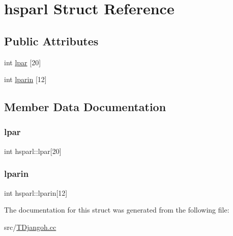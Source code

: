 \hypertarget{structhsparl}{}\section{hsparl Struct Reference}
\label{structhsparl}
\subsection*{Public Attributes}
\begin{DoxyCompactItemize}
\item 
int \hyperlink{structhsparl_a250d30e3f00cff03b5a413964acad6da}{lpar} \mbox{[}20\mbox{]}
\item 
int \hyperlink{structhsparl_afe554b3d19618780fe02d19bc2b86415}{lparin} \mbox{[}12\mbox{]}
\end{DoxyCompactItemize}


\subsection{Member Data Documentation}
\mbox{\label{structhsparl_a250d30e3f00cff03b5a413964acad6da}} 
\subsubsection{\texorpdfstring{lpar}{lpar}}
{\footnotesize\ttfamily int hsparl\+::lpar\mbox{[}20\mbox{]}}

\mbox{\label{structhsparl_afe554b3d19618780fe02d19bc2b86415}} 
\subsubsection{\texorpdfstring{lparin}{lparin}}
{\footnotesize\ttfamily int hsparl\+::lparin\mbox{[}12\mbox{]}}



The documentation for this struct was generated from the following file\+:\begin{DoxyCompactItemize}
\item 
src/\hyperlink{_t_djangoh_8cc}{T\+Djangoh.\+cc}\end{DoxyCompactItemize}
